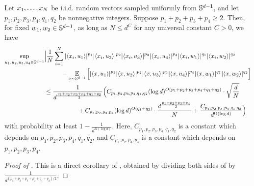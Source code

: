 \begin{lemma} \label{lemma:main_concentration_lemma}
Let $x_1, \ldots, x_N$ be i.i.d. random vectors sampled uniformly from $\mathbb{S}^{d - 1}$, and let $p_1, p_2, p_3, p_4, q_1, q_2$ be nonnegative integers. Suppose $p_1 + p_2 + p_3 + p_4 \geq 2$. Then, for fixed $w_1, w_2 \in \mathbb{S}^{d - 1}$, as long as $N \leq d^C$ for any universal constant $C > 0$, we have
\begin{align}
\sup_{u_1, u_2, u_3, u_4 \in \mathbb{S}^{d - 1}} & \Big|\frac{1}{N} \sum_{i = 1}^N |\langle x_i, u_1 \rangle|^{p_1} |\langle x_i, u_2 \rangle|^{p_2} |\langle x_i, u_3 \rangle|^{p_3} |\langle x_i, u_4 \rangle|^{p_4} |\langle x_i, w_1 \rangle|^{q_1} |\langle x_i, w_2 \rangle|^{q_2} \\
& \,\,\,\,\,\,\,\,\,\,\,\,\,\,\,\, - \operatorname*{\mathbb{E}}_{x \sim \mathbb{S}^{d - 1}} \Big[|\langle x, u_1 \rangle|^{p_1} |\langle x, u_2 \rangle|^{p_2} |\langle x, u_3 \rangle|^{p_3} |\langle x, u_4 \rangle|^{p_4} |\langle x, w_1 \rangle|^{q_1} |\langle x, w_2 \rangle|^{q_2} \Big] \\
& \leq \frac{1}{d^{\frac{p_1 + p_2 + p_3 + p_4 + q_1 + q_2}{2}}} \Big( C_{p_1, p_2, p_3, p_4, q_1, q_2} (\log d)^{O(p_1 + p_2 + p_3 + p_4 + q_1 + q_2)} \cdot \sqrt{\frac{d}{N}} \\
& \,\,\,\,\,\,\,\,\,\,\,\,\,\,\,\,\,\,\,\,\,\,\,\,\,\,\,\,\,\,\,\, + C_{p_1, p_2, p_3, p_4} (\log d)^{O(q_1 + q_2)} \cdot \frac{d^{\frac{p_1 + p_2 + p_3 + p_4}{2}}}{N} + \frac{C_{p_1, p_2, p_3, p_4, q_1, q_2}}{d^{\Omega(\log d)}} \Big)
\end{align}
with probability at least $1 - \frac{1}{d^{\Omega(\log d)}}$. Here, $C_{p_1, p_2, p_3, p_4, q_1, q_2}$ is a constant which depends on $p_1, p_2, p_3, p_4, q_1, q_2$, and $C_{p_1, p_2, p_3, p_4}$ is a constant which depends on $p_1, p_2, p_3, p_4$.
\end{lemma}
\begin{proof}[Proof of ]
This is a direct corollary of , obtained by dividing both sides of  by $\frac{1}{d^{(p_1 + p_2 + p_3 + p_4 + q_1 + q_2)/2}}$.
\end{proof}

